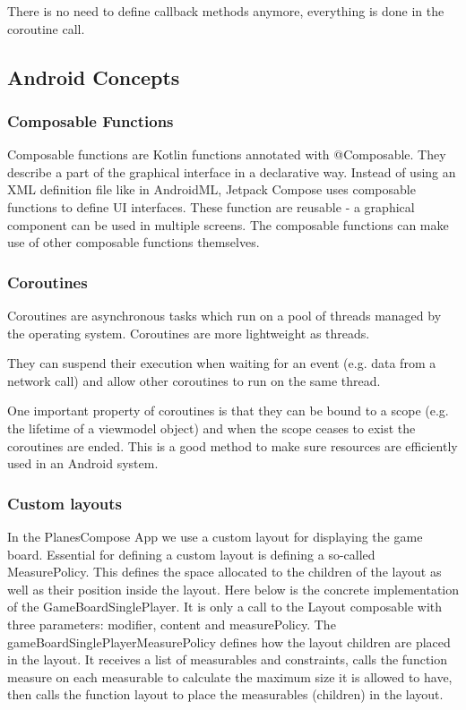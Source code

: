 There is no need to define callback methods anymore, everything is done in the coroutine call. 

\subsection { Android Concepts }

\subsubsection { Composable Functions }

Composable functions are Kotlin functions annotated with @Composable. They describe a part of the graphical interface in a declarative way. Instead of using an XML definition file like in AndroidML, Jetpack Compose uses composable functions to define UI interfaces. These function are reusable - a graphical component can be used in multiple screens. The composable functions can make use of other composable functions themselves. 

\subsubsection { Coroutines }

Coroutines are asynchronous tasks which run on a pool of threads managed by the operating system. Coroutines are more lightweight as threads. 

They can suspend their execution when waiting for an event (e.g. data from a network call) and allow other coroutines to run on the same thread.

One important property of coroutines is that they can be bound to a scope (e.g. the lifetime of a viewmodel object) and when the scope ceases to exist the coroutines are ended. This is a good method to make sure resources are efficiently used in an Android system.



\subsubsection {Custom layouts} \label{custom_layouts_compose}

In the PlanesCompose App we use a custom layout for displaying the game board. Essential for defining a custom layout is defining a so-called MeasurePolicy. This defines the space allocated to the children of the layout as well as their position inside the layout. Here below is the concrete implementation of the GameBoardSinglePlayer. It is only a call to the Layout composable with three parameters: modifier, content and measurePolicy. 
The gameBoardSinglePlayerMeasurePolicy defines how the layout children are placed in the layout. It receives a list of measurables and constraints, calls the function measure on each measurable to calculate the maximum size it is allowed to have, then calls the function layout to place the measurables (children) in the layout.  

